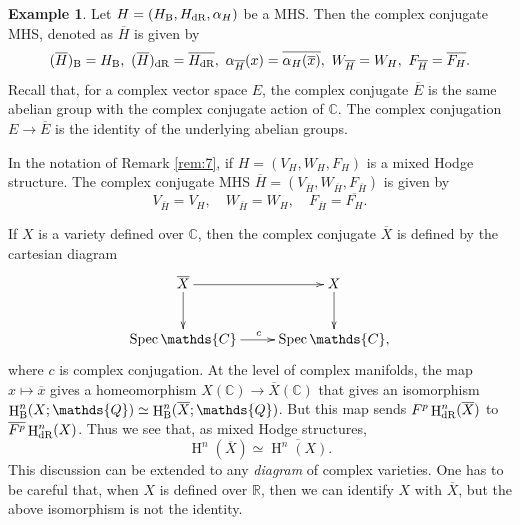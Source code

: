 \documentclass[11pt,a4paper]{amsart}
\newcommand{\Betti}{\text{\rm B}}
\newcommand{\dR}{\text{\rm dR}}
\newcommand{\C}{\mathds{C}}
\newcommand{\Q}{\mathds{Q}}
\newcommand{\R}{\mathds{R}}
\DeclareMathOperator{\Spec}{Spec}
\DeclareMathOperator{\rH}{H}
\numberwithin{equation}{section}
\theoremstyle{plain}
\theoremstyle{definition}
\newtheorem{ex}[prop]{Example}
\begin{document}
\begin{ex}\label{exm:6} Let $H=(H_{\Betti},H_{\dR},\alpha_{H} )$ be a
  MHS. Then the complex conjugate MHS, denoted as $\overline H$ is
  given by
  \begin{displaymath}
    (\overline H)_{\Betti}=H_{\Betti}, \ 
    (\overline H)_{\dR}=\overline{H_{\dR}}, \ 
    \alpha _{\overline H}(x) =
    \overline {\alpha _{H}(\overline x)}, \  W_{\overline {H}}=W_{H},\ 
    F_{\overline {H}} = \overline{F_{H}}.
  \end{displaymath}
  Recall that, for a complex vector space $E$, the complex conjugate
  $\overline E$ is the same abelian group with the complex conjugate
  action of $\C$. The complex conjugation $E\to \overline E$ is the
  identity of the underlying abelian groups.   

  In the notation  of Remark \ref{rem:7}, if $H=(V_{H},W_H,F_H)$ is a mixed Hodge
  structure. The complex conjugate MHS  $\overline {H}=(V_{\overline
    {H}},W_{\overline {H}},F_{\overline {H}})$ is given by
  \begin{displaymath}
    V_{\overline
      {H}}=V_{H},\quad W_{\overline {H}}=W_{H},\quad
    F_{\overline {H}} = \overline{F_{H}}.
  \end{displaymath}

  If $X$ is a variety defined over $\C$, then the complex conjugate
  $\overline X$ is
  defined by the cartesian diagram
  \begin{displaymath}
    \xymatrix{ \overline X \ar[r] \ar[d] & X\ar[d]\\
      \Spec \C \ar[r]^{c} &\Spec \C,
    }
  \end{displaymath}
  where $c$ is complex conjugation. At the level of complex manifolds, the map $x\mapsto \overline x$
  gives a homeomorphism $X(\C)\to \overline X(\C)$ that gives an
  isomorphism $\rH^{n}_{\Betti}(X;\Q)\simeq \rH^{n}_{\Betti}(\overline
  X;\Q)$. But this map sends $F^{p}\rH^{n}_{\dR}(\overline X)$ to
  $\overline {F^{p}}\rH^{n}_{\dR}(X)$. Thus we see that, as mixed
  Hodge structures,
  \begin{displaymath}
  \rH^{n}(\overline X)\simeq \overline{\rH^{n}(X)}. 
  \end{displaymath}
  This discussion can be extended to any \emph{diagram} of complex varieties.
  One has to be careful that, when $X$ is defined over $\R$, then we
  can identify $X$ with $\overline X$, but the above isomorphism is
  not the identity. 
\end{ex}
\end{document}
